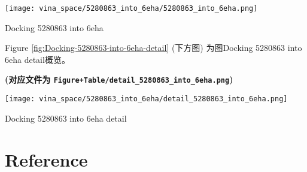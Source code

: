 \documentclass[
]{article}
\begin{document}
\def\@captype{figure}
\begin{center}
\texttt{[image: vina\_space/5280863\_into\_6eha/5280863\_into\_6eha.png]}
\caption{Docking 5280863 into 6eha}\label{fig:Docking-5280863-into-6eha}
\end{center}

Figure \ref{fig:Docking-5280863-into-6eha-detail} (下方图) 为图Docking 5280863 into 6eha detail概览。

\textbf{(对应文件为 \texttt{Figure+Table/detail\_5280863\_into\_6eha.png})}

\def\@captype{figure}
\begin{center}
\texttt{[image: vina\_space/5280863\_into\_6eha/detail\_5280863\_into\_6eha.png]}
\caption{Docking 5280863 into 6eha detail}\label{fig:Docking-5280863-into-6eha-detail}
\end{center}

\hypertarget{bibliography}{%
\section*{Reference}\label{bibliography}}
\end{document}
